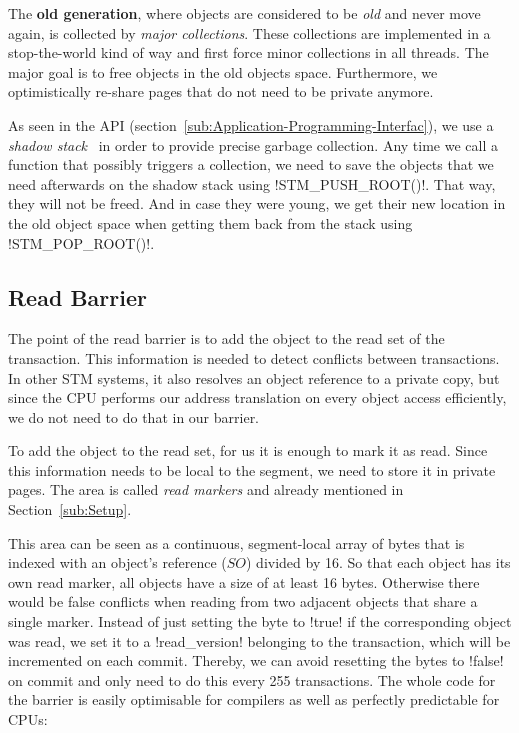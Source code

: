 \documentclass{sigplanconf}
\makeatletter
\renewcommand\lstinline[1][]{%
  \Collectverb{\@@myverb}%
}
\def\@@myverb#1{%
    \begingroup
    \fboxsep=0.2em
    \colorbox{verylightgray}{\oldlstinline|#1|}%
    \endgroup
}
\makeatother
\begin{document}
The \textbf{old generation}, where objects are considered to be
\emph{old} and never move again, is collected by \emph{major
  collections}.  These collections are implemented in a stop-the-world
kind of way and first force minor collections in all threads. The
major goal is to free objects in the old objects space. Furthermore,
we optimistically re-share pages that do not need to be private
anymore.

As seen in the API (section~\ref{sub:Application-Programming-Interfac}),
we use a \emph{shadow stack}~\cite{fergus02} in order to provide precise garbage
collection.  Any time we call a function that possibly triggers a
collection, we need to save the objects that we need afterwards on the
shadow stack using \lstinline!STM_PUSH_ROOT()!.  That way, they will
not be freed. And in case they were young, we get their new location
in the old object space when getting them back from the stack using
\lstinline!STM_POP_ROOT()!.




\subsection{Read Barrier}

The point of the read barrier is to add the object to the read set of
the transaction. This information is needed to detect conflicts
between transactions. In other STM systems, it also resolves an object reference to
a private copy, but since the CPU performs our address translation on
every object access efficiently, we do not need to do that in our
barrier.

To add the object to the read set, for us it is enough to mark it as
read. Since this information needs to be local to the segment, we need
to store it in private pages. The area is called \emph{read markers}
and already mentioned in Section~\ref{sub:Setup}.

This area can be seen as a continuous, segment-local array of bytes
that is indexed with an object's reference ($SO$) divided by 16. So
that each object has its own read marker, all objects have a size of
at least 16 bytes. Otherwise there would be false conflicts when
reading from two adjacent objects that share a single marker.
Instead of just setting the byte to \lstinline!true!  if the
corresponding object was read, we set it to a \lstinline!read_version!
belonging to the transaction, which will be incremented on each
commit.  Thereby, we can avoid resetting the bytes to
\lstinline!false!  on commit and only need to do this every 255
transactions. The whole code for the barrier is easily optimisable for
compilers as well as perfectly predictable for CPUs:
\end{document}
